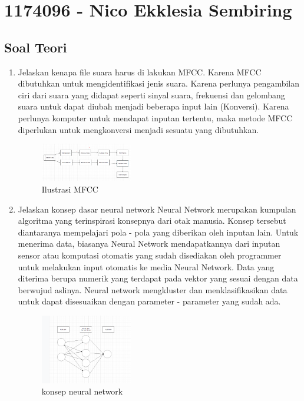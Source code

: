 \section{1174096 - Nico Ekklesia Sembiring}
\subsection{Soal Teori}
\begin{enumerate}

	\item Jelaskan kenapa ﬁle suara harus di lakukan MFCC.
	\hfill\break
	Karena MFCC dibutuhkan untuk mengidentifikasi jenis suara. Karena perlunya pengambilan ciri dari suara yang didapat seperti sinyal suara, frekuensi dan gelombang suara untuk dapat diubah menjadi beberapa input lain (Konversi). Karena perlunya komputer untuk mendapat inputan tertentu, maka metode MFCC diperlukan untuk mengkonversi menjadi sesuatu yang dibutuhkan. 
	
    \begin{figure}[H]
	\centering
		\includegraphics[width=4cm]{figures/1174096/tugas6/teori_1.PNG}
		\caption{Ilustrasi MFCC}
	\end{figure}

	\item Jelaskan konsep dasar neural network
	\hfill\break
    Neural Network merupakan kumpulan algoritma yang terinspirasi konsepnya dari otak manusia. Konsep tersebut diantaranya mempelajari pola - pola yang diberikan oleh inputan lain. Untuk menerima data, biasanya Neural Network mendapatkannya dari inputan sensor atau komputasi otomatis yang sudah disediakan oleh programmer untuk melakukan input otomatis ke media Neural Network. Data yang diterima berupa numerik yang terdapat pada vektor yang sesuai dengan data berwujud aslinya. Neural network mengkluster dan menklasifikasikan data untuk dapat disesuaikan dengan parameter - parameter yang sudah ada. 
	
    \begin{figure}[H]
	\centering
		\includegraphics[width=4cm]{figures/1174096/tugas6/teori_2.PNG}
		\caption{konsep neural network}
	\end{figure}



\end{enumerate}
